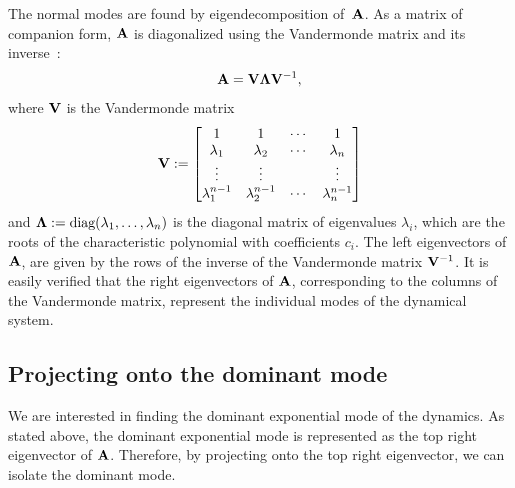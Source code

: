 \documentclass[%
 reprint,
 amsmath,amssymb,
 aps,
]{revtex4-2}
\begin{document}
The normal modes are found by eigendecomposition of~${\bf A}$.  As a matrix of companion form, ${\bf A}$ is diagonalized using the Vandermonde matrix and its inverse~\citep{bellman1997introduction}:
\begin{align*}
    {\bf A}={\bf V}\boldsymbol{\Lambda}{\bf V}^{-1},
\end{align*}
where ${\bf V}$ is the Vandermonde matrix
\begin{align*}
    {\bf V}:=\begin{bmatrix}
        1&1&\cdots&1\\
        \lambda_1&\lambda_2&\cdots & \lambda_n\\
        \vdots& \vdots & & \vdots\\
        \lambda_1^{n-1} & \lambda_2^{n-1} & \cdots & \lambda_n^{n-1}
    \end{bmatrix}
\end{align*}
and $\boldsymbol{\Lambda}:=\text{diag}(\lambda_1,\dots,\lambda_n)$ is the diagonal matrix of eigenvalues $\lambda_i$, which are the roots of the characteristic polynomial with coefficients $c_i$. The left eigenvectors of ${\bf A}$, are given by the rows of the inverse of the Vandermonde matrix ${\bf V}^{-1}$. It is easily verified that the right eigenvectors of ${\bf A}$, corresponding to the columns of the Vandermonde matrix, represent the individual modes of the dynamical system.  

\subsection{Projecting onto the dominant mode}
We are interested in finding the dominant exponential mode of the dynamics. As stated above, the dominant exponential mode is represented as the top right eigenvector of ${\bf A}$. Therefore, by projecting onto the top right eigenvector, we can isolate the dominant mode. 
\end{document}
